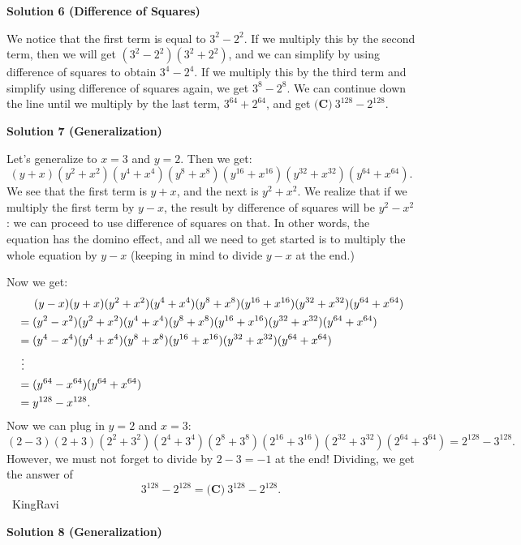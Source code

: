 \begin{enumerate}
 



\textbf{Solution 6 (Difference of Squares)}

We notice that the first term is equal to $3^2 - 2^2$. If we multiply this by the second term, then we will get $(3^2 - 2^2)(3^2 + 2^2)$, and we can simplify by using difference of squares to obtain $3^4 - 2^4$. If we multiply this by the third term and simplify using difference of squares again, we get $3^8 - 2^8$. We can continue down the line until we multiply by the last term, $3^{64} + 2^{64}$, and get $\boxed{\textbf{(C)} ~3^{128}-2^{128}}$.

 



\textbf{Solution 7 (Generalization)}

Let’s generalize to $x=3$ and $y=2$. Then we get:
 \[(y+x)(y^2+x^2)(y^4+x^4)(y^8+x^8)(y^{16}+x^{16})(y^{32}+x^{32})(y^{64}+x^{64}).\]We see that the first term is $y+x$, and the next is $y^2+x^2$. We realize that if we multiply the first term by $y-x$, the result by difference of squares will be $y^2-x^2$: we can proceed to use difference of squares on that. In other words, the equation has the domino effect, and all we need to get started is to multiply the whole equation by $y-x$ (keeping in mind to divide $y-x$ at the end.)

 Now we get:
 \begin{align*} &\hspace{5.125mm}(y-x)(y+x)(y^2+x^2)(y^4+x^4)(y^8+x^8)(y^{16}+x^{16})(y^{32}+x^{32})(y^{64}+x^{64}) \\ &=(y^2-x^2)(y^2+x^2)(y^4+x^4)(y^8+x^8)(y^{16}+x^{16})(y^{32}+x^{32})(y^{64}+x^{64}) \\ &=(y^4-x^4)(y^4+x^4)(y^8+x^8)(y^{16}+x^{16})(y^{32}+x^{32})(y^{64}+x^{64}) \\ & \ \vdots \\ &=(y^{64}-x^{64})(y^{64}+x^{64}) \\ &=y^{128}-x^{128}. \end{align*}
Now we can plug in $y = 2$ and $x = 3:$ 
 \[(2-3)(2+3)(2^2+3^2)(2^4+3^4)(2^8+3^8)(2^{16}+3^{16})(2^{32}+3^{32})(2^{64}+3^{64}) = 2^{128}-3^{128}.\]However, we must not forget to divide by $2-3 = -1$ at the end! Dividing, we get the answer of 
 \[3^{128}-2^{128} = \boxed{\textbf{(C)} ~3^{128}-2^{128}}.\]~KingRavi

 



\textbf{Solution 8 (Generalization)}


\end{enumerate}
